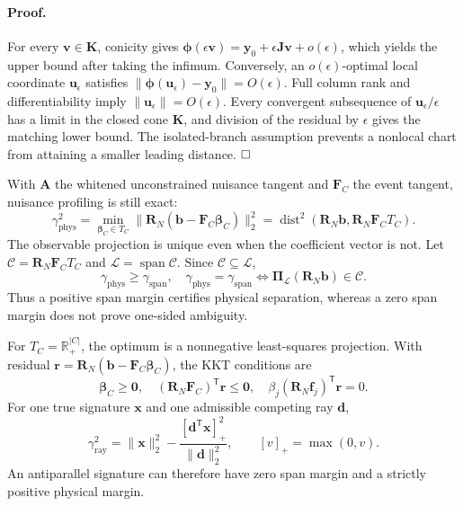 \paragraph{Proof.}
For every $\bm v\in\bm K$, conicity gives
$\bm\phi(\epsilon\bm v)=\bm y_0+\epsilon\bm J\bm v+o(\epsilon)$, which yields
the upper bound after taking the infimum. Conversely, an
$o(\epsilon)$-optimal local coordinate $\bm u_\epsilon$ satisfies
$\|\bm\phi(\bm u_\epsilon)-\bm y_0\|=O(\epsilon)$. Full column rank and
differentiability imply $\|\bm u_\epsilon\|=O(\epsilon)$. Every convergent
subsequence of $\bm u_\epsilon/\epsilon$ has a limit in the closed cone
$\bm K$, and division of the residual by $\epsilon$ gives the matching lower
bound. The isolated-branch assumption prevents a nonlocal chart from attaining
a smaller leading distance. $\hfill\square$

With $\bm A$ the whitened unconstrained nuisance tangent and $\bm F_C$ the
event tangent, nuisance profiling is still exact:
\begin{equation}
 \gamma_{\mathrm{phys}}^2
 =\min_{\bm\beta_C\in T_C}
 \|\bm R_N(\bm b-\bm F_C\bm\beta_C)\|_2^2
 =\operatorname{dist}^2(\bm R_N\bm b,\bm R_N\bm F_C T_C).
 \label{eq:supp-cone-profiled-margin}
\end{equation}
The observable projection is unique even when the coefficient vector is not.
Let $\mathcal C=\bm R_N\bm F_C T_C$ and
$\mathcal L=\operatorname{span}\mathcal C$. Since
$\mathcal C\subseteq\mathcal L$,
\begin{equation}
 \gamma_{\mathrm{phys}}\ge\gamma_{\mathrm{span}},
 \quad
 \gamma_{\mathrm{phys}}=\gamma_{\mathrm{span}}
 \iff
 \bm\Pi_{\mathcal L}(\bm R_N\bm b)\in\mathcal C.
 \label{eq:supp-cone-span-relation}
\end{equation}
Thus a positive span margin certifies physical separation, whereas a zero span
margin does not prove one-sided ambiguity.

For $T_C=\mathbb R_+^{|C|}$, the optimum is a nonnegative least-squares
projection. With residual
$\bm r=\bm R_N(\bm b-\bm F_C\bm\beta_C)$, the KKT conditions are
\begin{equation}
 \bm\beta_C\ge\bm0,\quad
 (\bm R_N\bm F_C)^{\mathsf T}\bm r\le\bm0,\quad
 \beta_j(\bm R_N\bm f_j)^{\mathsf T}\bm r=0.
 \label{eq:supp-cone-kkt}
\end{equation}
For one true signature $\bm x$ and one admissible competing ray $\bm d$,
\begin{equation}
 \gamma_{\mathrm{ray}}^2
 =\|\bm x\|_2^2-
 \frac{[\bm d^{\mathsf T}\bm x]_+^2}{\|\bm d\|_2^2},
 \qquad [v]_+=\max(0,v).
 \label{eq:supp-single-ray-margin}
\end{equation}
An antiparallel signature can therefore have zero span margin and a strictly
positive physical margin.

